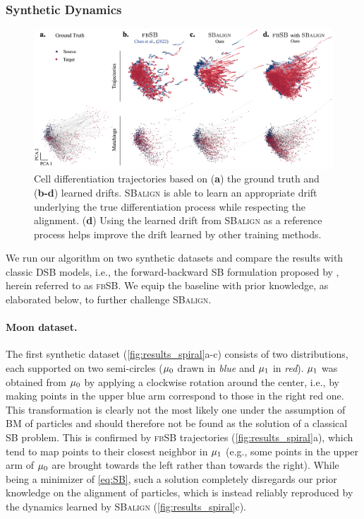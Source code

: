 \subsubsection{Synthetic Dynamics}
\label{sec:sbalign_synthetic}

\begin{figure}
    \centering
    \includegraphics[width=\textwidth]{figures/fig_cell_trajectories_matchings.png}
    \caption{Cell differentiation trajectories based on (\textbf{a}) the ground truth and (\textbf{b-d}) learned drifts. \textsc{SBalign} is able to learn an appropriate drift underlying the true differentiation process while respecting the alignment. (\textbf{d}) Using the learned drift from \textsc{SBalign} as a reference process helps improve the drift learned by other training methods.}
    \label{fig:results_cell_traj}
\end{figure}

We run our algorithm on two synthetic datasets and compare the results with classic \acrlong{DSB} models, i.e., the forward-backward \acrshort{SB} formulation proposed by \citet{chen2021likelihood}, herein referred to as \textsc{fbSB}. We equip the baseline with prior knowledge, as elaborated below, to further challenge \textsc{SBalign}.

\paragraph{Moon dataset.}
The first synthetic dataset (\cref{fig:results_spiral}a-c) consists of two distributions, each supported on two semi-circles ($\mu_0$ drawn in \textit{blue} and $\mu_1$ in \textit{red}).
$\mu_1$ was obtained from $\mu_0$ by applying a clockwise rotation around the center, i.e., by making points in the upper blue arm correspond to those in the right red one.
This transformation is clearly not the most likely one under the assumption of \acrshort{BM} of particles and should therefore not be found as the solution of a classical \acrshort{SB} problem. 
This is confirmed by \textsc{fbSB} trajectories (\cref{fig:results_spiral}a), which tend to map points to their closest neighbor in $\mu_1$ (e.g., some points in the upper arm of $\mu_0$ are brought towards the left rather than towards the right). 
While being a minimizer of \eqref{eq:SB}, such a solution completely disregards our prior knowledge on the alignment of particles, which is instead reliably reproduced by the dynamics learned by \textsc{SBalign} (\cref{fig:results_spiral}c).

